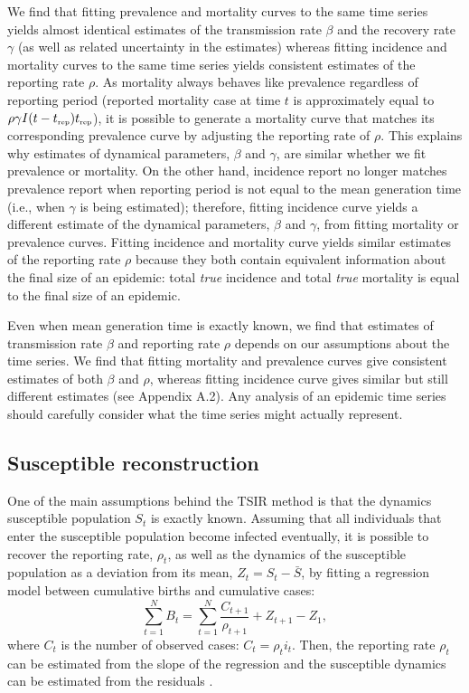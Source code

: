 \documentclass{article}
\newcommand{\tsub}[2]{#1_{{\textrm{\tiny #2}}}}
\begin{document}
We find that fitting prevalence and mortality curves to the same time series yields almost identical estimates of the transmission rate $\beta$ and the recovery rate $\gamma$ (as well as related uncertainty in the estimates) whereas fitting incidence and mortality curves to the same time series yields consistent estimates of the reporting rate $\rho$.
As mortality always behaves like prevalence regardless of reporting period (reported mortality case at time $t$ is approximately equal to $\rho \gamma I(t-\tsub{t}{rep}) \tsub{t}{rep}$),
it is possible to generate a mortality curve that matches its corresponding prevalence curve by adjusting the reporting rate of $\rho$.
This explains why estimates of dynamical parameters, $\beta$ and $\gamma$, are similar whether we fit prevalence or mortality.
On the other hand, incidence report no longer matches prevalence report when reporting period is not equal to the mean generation time (i.e., when $\gamma$ is being estimated); therefore, fitting incidence curve yields a different estimate of the dynamical parameters, $\beta$ and $\gamma$, from fitting mortality or prevalence curves.
Fitting incidence and mortality curve yields similar estimates of the reporting rate $\rho$ because they both contain equivalent information about the final size of an epidemic: total \emph{true} incidence and total \emph{true} mortality is equal to the final size of an epidemic.

Even when mean generation time is exactly known, we find that estimates of transmission rate $\beta$ and reporting rate $\rho$ depends on our assumptions about the time series.
We find that fitting mortality and prevalence curves give consistent estimates of both $\beta$ and $\rho$, whereas fitting incidence curve gives similar but still different estimates (see Appendix A.2).
Any analysis of an epidemic time series should carefully consider what the time series might actually represent.

\subsection{Susceptible reconstruction}

One of the main assumptions behind the TSIR method is that the dynamics susceptible population $S_t$ is exactly known.
Assuming that all individuals that enter the susceptible population become infected eventually, it is possible to recover the reporting rate, $\rho_t$, as well as the dynamics of the susceptible population as a deviation from its mean, $Z_t = S_t - \bar{S}$, by fitting a regression model between cumulative births and cumulative cases: 
\begin{equation}
\sum_{t=1}^N B_t = \sum_{t=1}^N \frac{C_{t+1}}{\rho_{t+1}} + Z_{t+1} - Z_1,
\end{equation}
where $C_t$ is the number of observed cases: $C_t = \rho_t i_t$.
Then, the reporting rate $\rho_t$ can be estimated from the slope of the regression and the susceptible dynamics can be estimated from the residuals \citep{finkenstadt2000time}. 
\end{document}
